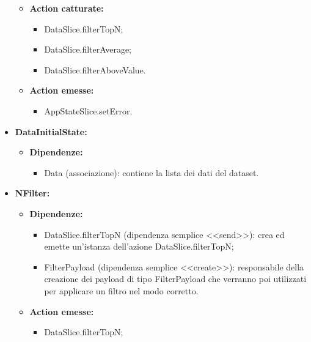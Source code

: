 \begin{itemize}
\begin{itemize}
        \item \textbf{Action catturate:}
        \begin{itemize}
            \item DataSlice.filterTopN;
            \item DataSlice.filterAverage;
            \item DataSlice.filterAboveValue.
        \end{itemize} 
        \item \textbf{Action emesse:}
        \begin{itemize}
            \item AppStateSlice.setError.
        \end{itemize} 
    \end{itemize}

    \item \textbf{DataInitialState:}
    \begin{itemize}
        \item \textbf{Dipendenze:}
        \begin{itemize}
            \item Data (associazione): contiene la lista dei dati del dataset.
        \end{itemize} 
    \end{itemize}

    \item \textbf{NFilter:}
    \begin{itemize}
        \item \textbf{Dipendenze:}
        \begin{itemize}
            \item DataSlice.filterTopN (dipendenza semplice <<send>>): crea ed emette un’istanza dell’azione DataSlice.filterTopN;
            \item FilterPayload (dipendenza semplice <<create>>): responsabile della creazione dei payload di tipo FilterPayload che verranno poi utilizzati per applicare un filtro nel modo corretto.
        \end{itemize} 
        \item \textbf{Action emesse:}
        \begin{itemize}
            \item DataSlice.filterTopN;
        \end{itemize} 
    \end{itemize}


\end{itemize}
